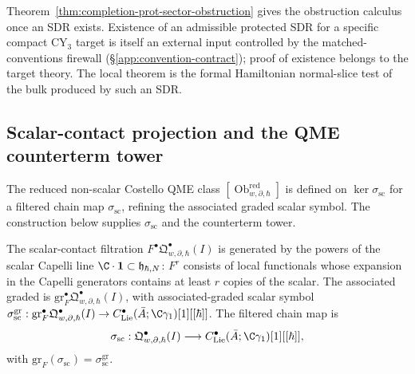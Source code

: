 \begin{rmk}
\label{rmk:completion-protected-existence}
Theorem~\ref{thm:completion-prot-sector-obstruction} gives the
obstruction calculus once an SDR exists.  Existence of an
admissible protected SDR for a specific compact CY\(_3\) target
is itself an external input controlled by the matched-conventions
firewall (\S\ref{app:convention-contract}); proof of existence belongs
to the target theory.  The local theorem is the formal Hamiltonian normal-slice
test of the bulk produced by such an SDR.
\end{rmk}

\subsection{Scalar-contact projection and the QME counterterm tower}
\label{ssec:completion-qme-tower}

The reduced non-scalar Costello QME class
\([\operatorname{Ob}^{\mathrm{red}}_{w,\partial,\hbar}]\) is defined
on \(\ker\sigma_{\mathrm{sc}}\) for a filtered chain map
\(\sigma_{\mathrm{sc}}\), refining the associated graded scalar
symbol.  The construction below supplies \(\sigma_{\mathrm{sc}}\) and
the counterterm tower.

\begin{defn}
\label{def:completion-scalar-contact}
The scalar-contact filtration
\(F^\bullet\mathfrak Q^\bullet_{w,\partial,\hbar}(I)\) is generated
by the powers of the scalar Capelli line \(\C\cdot\mathbf 1\subset
\mathfrak h_{\hbar,N}\): \(F^r\) consists of local functionals
whose expansion in the Capelli generators contains at least \(r\)
copies of the scalar.  The associated graded is
\(\mathrm{gr}^\bullet_F\mathfrak Q^\bullet_{w,\partial,\hbar}(I)\),
with associated-graded scalar symbol
\(\sigma_{\mathrm{sc}}^{\mathrm{gr}}:\mathrm{gr}^\bullet_F
\mathfrak Q^\bullet_{w,\partial,\hbar}(I)\to
C^\bullet_{\mathrm{Lie}}(\bar A;\C\gamma_1)[1][[\hbar]]\).  The
filtered chain map is
\[
  \sigma_{\mathrm{sc}}:\mathfrak Q^\bullet_{w,\partial,\hbar}(I)
   \longrightarrow C^\bullet_{\mathrm{Lie}}(\bar A;\C\gamma_1)[1][[\hbar]],
\]
with \(\mathrm{gr}_F(\sigma_{\mathrm{sc}})=\sigma_{\mathrm{sc}}^{\mathrm{gr}}\).
\end{defn}

